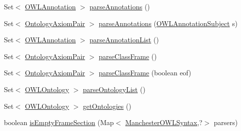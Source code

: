 \begin{DoxyCompactItemize}
\item 
Set$<$ \hyperlink{interfaceorg_1_1semanticweb_1_1owlapi_1_1model_1_1_o_w_l_annotation}{O\-W\-L\-Annotation} $>$ \hyperlink{classorg_1_1coode_1_1owlapi_1_1manchesterowlsyntax_1_1_manchester_o_w_l_syntax_editor_parser_a8221c41b02bdf206356aade49fecde8a}{parse\-Annotations} ()
\item 
Set$<$ \hyperlink{classorg_1_1coode_1_1owlapi_1_1manchesterowlsyntax_1_1_ontology_axiom_pair}{Ontology\-Axiom\-Pair} $>$ \hyperlink{classorg_1_1coode_1_1owlapi_1_1manchesterowlsyntax_1_1_manchester_o_w_l_syntax_editor_parser_a6f94b41dd348bbb7130161a3bc84d7bf}{parse\-Annotations} (\hyperlink{interfaceorg_1_1semanticweb_1_1owlapi_1_1model_1_1_o_w_l_annotation_subject}{O\-W\-L\-Annotation\-Subject} s)
\item 
Set$<$ \hyperlink{interfaceorg_1_1semanticweb_1_1owlapi_1_1model_1_1_o_w_l_annotation}{O\-W\-L\-Annotation} $>$ \hyperlink{classorg_1_1coode_1_1owlapi_1_1manchesterowlsyntax_1_1_manchester_o_w_l_syntax_editor_parser_a0ca88575247f6d4e9ebf547df2d7e590}{parse\-Annotation\-List} ()
\item 
Set$<$ \hyperlink{classorg_1_1coode_1_1owlapi_1_1manchesterowlsyntax_1_1_ontology_axiom_pair}{Ontology\-Axiom\-Pair} $>$ \hyperlink{classorg_1_1coode_1_1owlapi_1_1manchesterowlsyntax_1_1_manchester_o_w_l_syntax_editor_parser_a49566171f52363a74586c4990aa7db04}{parse\-Class\-Frame} ()
\item 
Set$<$ \hyperlink{classorg_1_1coode_1_1owlapi_1_1manchesterowlsyntax_1_1_ontology_axiom_pair}{Ontology\-Axiom\-Pair} $>$ \hyperlink{classorg_1_1coode_1_1owlapi_1_1manchesterowlsyntax_1_1_manchester_o_w_l_syntax_editor_parser_a56c055437672cda421774ad538f6278b}{parse\-Class\-Frame} (boolean eof)
\item 
Set$<$ \hyperlink{interfaceorg_1_1semanticweb_1_1owlapi_1_1model_1_1_o_w_l_ontology}{O\-W\-L\-Ontology} $>$ \hyperlink{classorg_1_1coode_1_1owlapi_1_1manchesterowlsyntax_1_1_manchester_o_w_l_syntax_editor_parser_a6f50a828270e4106a50e68a71038b722}{parse\-Ontology\-List} ()
\item 
Set$<$ \hyperlink{interfaceorg_1_1semanticweb_1_1owlapi_1_1model_1_1_o_w_l_ontology}{O\-W\-L\-Ontology} $>$ \hyperlink{classorg_1_1coode_1_1owlapi_1_1manchesterowlsyntax_1_1_manchester_o_w_l_syntax_editor_parser_a6ed75e6a53243baa240aa8b33c59f6a7}{get\-Ontologies} ()
\item 
boolean \hyperlink{classorg_1_1coode_1_1owlapi_1_1manchesterowlsyntax_1_1_manchester_o_w_l_syntax_editor_parser_af1bdb62d345a384e07dbe013dfb356f0}{is\-Empty\-Frame\-Section} (Map$<$ \hyperlink{enumorg_1_1coode_1_1owlapi_1_1manchesterowlsyntax_1_1_manchester_o_w_l_syntax}{Manchester\-O\-W\-L\-Syntax},?$>$ parsers)

\end{DoxyCompactItemize}
